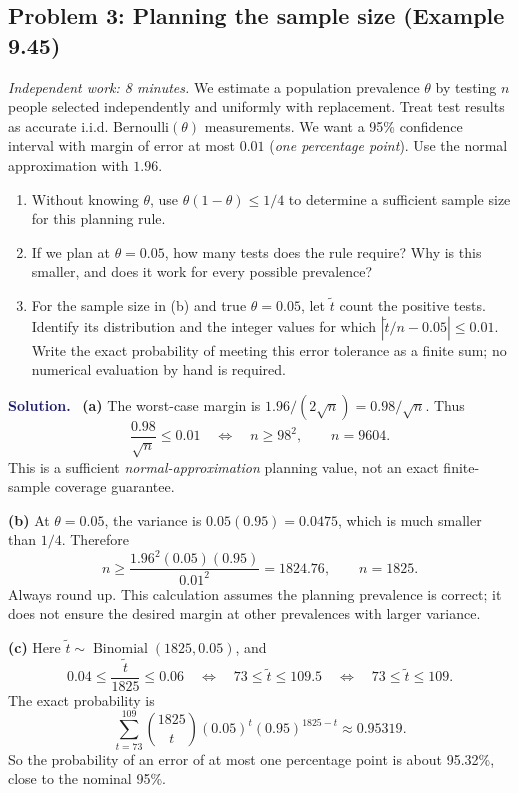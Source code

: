 \documentclass[11pt]{article}
\newcommand{\rv}[1]{\widetilde{#1}}
\newenvironment{answer}{%
    \par\medskip\noindent\textcolor{MidnightBlue}{\textbf{Solution.}}\ }
    {\par\medskip}
\newcommand{\workingspace}[1]{}
\newcommand{\workingspace}[1]{\vspace{#1}}
\begin{document}
\newpage
\subsection*{Problem 3: Planning the sample size (Example 9.45)}
\noindent\textit{Independent work: 8 minutes.}
We estimate a population prevalence $\theta$ by testing $n$ people
selected independently and uniformly with replacement. Treat test results
as accurate i.i.d. Bernoulli$(\theta)$ measurements. We want a 95\%
confidence interval with margin of error at most $0.01$
(\emph{one percentage point}). Use the normal approximation with $1.96$.
\begin{enumerate}
  \item Without knowing $\theta$, use $\theta(1-\theta)\leq1/4$ to
    determine a sufficient sample size for this planning rule.
  \item If we plan at $\theta=0.05$, how many tests does the rule require?
    Why is this smaller, and does it work for every possible prevalence?
  \item For the sample size in (b) and true $\theta=0.05$, let
    $\rv{t}$ count the positive tests. Identify its distribution and the
    integer values for which $|\rv{t}/n-0.05|\leq0.01$.
    Write the exact probability of meeting this error tolerance as a
    finite sum; no numerical evaluation by hand is required.
\end{enumerate}
\workingspace{10cm}

\begin{answer}
\textbf{(a)} The worst-case margin is $1.96/(2\sqrt n)=0.98/\sqrt n$.
Thus
\[
  \frac{0.98}{\sqrt n}\leq0.01
  \quad\Longleftrightarrow\quad n\geq98^2,
  \qquad \boxed{n=9604}.
\]
This is a sufficient \emph{normal-approximation} planning value, not an
exact finite-sample coverage guarantee.

\textbf{(b)} At $\theta=0.05$, the variance is $0.05(0.95)=0.0475$,
which is much smaller than $1/4$. Therefore
\[
  n\geq\frac{1.96^2(0.05)(0.95)}{0.01^2}=1824.76,
  \qquad \boxed{n=1825}.
\]
Always round up. This calculation assumes the planning prevalence is
correct; it does not ensure the desired margin at other prevalences
with larger variance.

\textbf{(c)} Here $\rv{t}\sim\operatorname{Binomial}(1825,0.05)$, and
\[
  0.04\leq\frac{\rv{t}}{1825}\leq0.06
  \quad\Longleftrightarrow\quad73\leq\rv{t}\leq109.5
  \quad\Longleftrightarrow\quad73\leq\rv{t}\leq109.
\]
The exact probability is
\[
  \boxed{\sum_{t=73}^{109}\binom{1825}{t}(0.05)^t(0.95)^{1825-t}
    \approx0.95319.}
\]
So the probability of an error of at most one percentage point is about
95.32\%, close to the nominal 95\%.
\end{answer}
\end{document}
